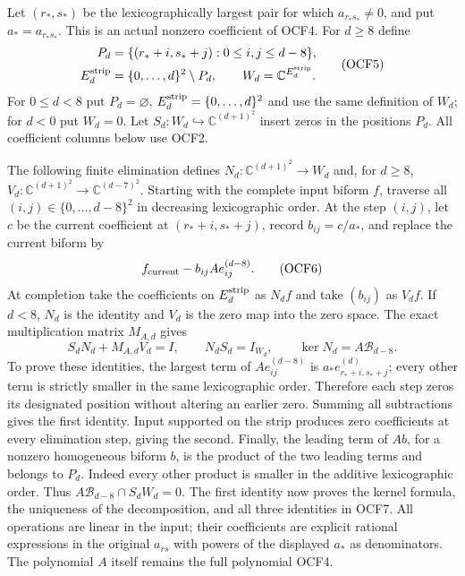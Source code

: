 \documentclass[11pt,a4paper]{article}
\begin{document}
Let $(r_*,s_*)$ be the lexicographically largest pair for which
$a_{r_*s_*}\ne0$, and put $a_*=a_{r_*s_*}$. This is an
actual nonzero coefficient of OCF4. For $d\geq8$ define
\[
 \begin{split}
 P_d&=\{(r_*+i,s_*+j):0\leq i,j\leq d-8\},\\
 E_d^{\rm strip}&=\{0,\ldots,d\}^2\setminus P_d,\qquad
 W_d=\mathbb C^{E_d^{\rm strip}}.
 \end{split}\tag{OCF5}
\]
For $0\leq d<8$ put $P_d=\varnothing$,
$E_d^{\rm strip}=\{0,\ldots,d\}^2$ and use the same definition
of $W_d$; for $d<0$ put $W_d=0$. Let
$S_d:W_d\hookrightarrow\mathbb C^{(d+1)^2}$ insert zeros in
the positions $P_d$. All coefficient columns below use OCF2.

The following finite elimination defines
$N_d:\mathbb C^{(d+1)^2}\to W_d$ and, for $d\geq8$,
$V_d:\mathbb C^{(d+1)^2}\to\mathbb C^{(d-7)^2}$.
Starting with the complete input biform $f$, traverse all
$(i,j)\in\{0,\ldots,d-8\}^2$ in decreasing lexicographic order.
At the step $(i,j)$, let $c$ be the current coefficient at
$(r_*+i,s_*+j)$, record $b_{ij}=c/a_*$, and replace the current
biform by
\[
       f_{\rm current}-b_{ij}A e_{ij}^{(d-8)}.
 \tag{OCF6}
\]
At completion take the coefficients on $E_d^{\rm strip}$ as
$N_df$ and take $(b_{ij})$ as $V_df$. If $d<8$, $N_d$ is the
identity and $V_d$ is the zero map into the zero space.
The exact multiplication matrix $M_{A,d}$ gives
\[
 S_dN_d+M_{A,d}V_d=I,\qquad
 N_dS_d=I_{W_d},\qquad
 \ker N_d=A\mathcal B_{d-8}.
 \tag{OCF7}
\]
To prove these identities, the largest term of
$A e_{ij}^{(d-8)}$ is $a_*e_{r_*+i,s_*+j}^{(d)}$;
every other term is strictly smaller in the same lexicographic
order. Therefore each step zeros its designated position without
altering an earlier zero. Summing all subtractions gives the
first identity. Input supported on the strip produces zero
coefficients at every elimination step, giving the second.
Finally, the leading term of $Ab$, for a nonzero homogeneous
biform $b$, is the product of the two leading terms and belongs
to $P_d$. Indeed every other product is smaller in the additive
lexicographic order. Thus
$A\mathcal B_{d-8}\cap S_dW_d=0$. The first identity now proves
the kernel formula, the uniqueness of the decomposition, and all
three identities in OCF7. All operations are linear in the input;
their coefficients are explicit rational expressions in the
original $a_{rs}$ with powers of the displayed $a_*$ as denominators.
The polynomial $A$ itself remains the full polynomial OCF4.
\end{document}
